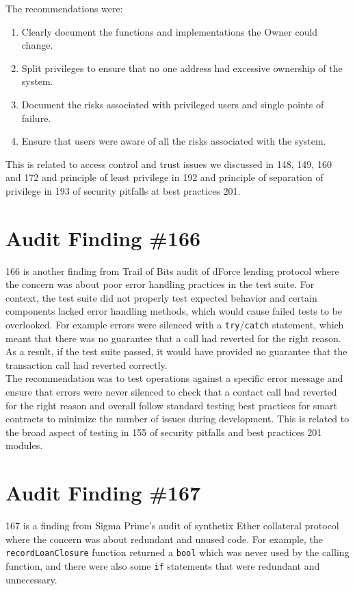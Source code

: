 The recommendations were:
    \begin{enumerate}
    \item Clearly document the functions and implementations the Owner could change.
    \item Split privileges to ensure that no one address had excessive ownership of the system.
    \item Document the risks associated with privileged users and single points of failure.
    \item Ensure that users were aware of all the risks associated with the system.
    \end{enumerate}
This is related to access control and trust issues we discussed in 148, 149, 160 and 172 and principle of least privilege in 192 and principle of separation of privilege in 193 of security pitfalls at best practices 201.

\section{Audit Finding \#166}

166 is another finding from Trail of Bits audit of dForce lending protocol where the concern was about poor error handling practices in the test suite. For context, the test suite did not properly test expected behavior and certain components lacked error handling methods, which would cause failed tests to be overlooked. For example errors were silenced with a \verb|try|/\verb|catch| statement, which meant that there was no guarantee that a call had reverted for the right reason. As a result, if the test suite passed, it would have provided no guarantee that the transaction call had reverted correctly.\\

The recommendation was to test operations against a specific error message and ensure that errors were never silenced to check that a contact call had reverted for the right reason and overall follow standard testing best practices for smart contracts to minimize the number of issues during development. This is related to the broad aspect of testing in 155 of security pitfalls and best practices 201 modules.

\section{Audit Finding \#167}

167 is a finding from Sigma Prime's audit of synthetix Ether collateral protocol where the concern was about redundant and unused code. For example, the \verb|recordLoanClosure| function returned a \verb|bool| which was never used by the calling function, and there were also some \verb|if| statements that were redundant and unnecessary.\\

